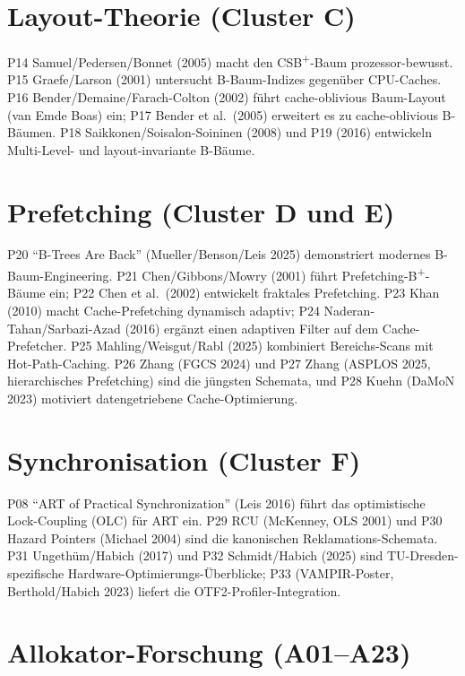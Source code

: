 \section{Layout-Theorie (Cluster C)}\label{sec:cluster-c}

P14 Samuel/Pedersen/Bonnet (2005) macht den CSB\textsuperscript{+}-Baum prozessor-bewusst.
P15 Graefe/Larson (2001) untersucht B-Baum-Indizes gegenüber CPU-Caches. P16
Bender/Demaine/Farach-Colton (2002) führt cache-oblivious Baum-Layout (van Emde Boas) ein;
P17 Bender et al.\ (2005) erweitert es zu cache-oblivious B-Bäumen. P18
Saikkonen/Soisalon-Soininen (2008) und P19 (2016) entwickeln Multi-Level- und
layout-invariante B-Bäume.

\section{Prefetching (Cluster D und E)}\label{sec:cluster-de}

P20 ``B-Trees Are Back'' (Mueller/Benson/Leis 2025) demonstriert modernes B-Baum-Engineering.
P21 Chen/Gibbons/Mowry (2001) führt Prefetching-B\textsuperscript{+}-Bäume ein; P22 Chen et
al.\ (2002) entwickelt fraktales Prefetching. P23 Khan (2010) macht Cache-Prefetching
dynamisch adaptiv; P24 Naderan-Tahan/Sarbazi-Azad (2016) ergänzt einen adaptiven Filter auf
dem Cache-Prefetcher. P25 Mahling/Weisgut/Rabl (2025) kombiniert Bereichs-Scans mit
Hot-Path-Caching. P26 Zhang (FGCS 2024) und P27 Zhang (ASPLOS 2025, hierarchisches
Prefetching) sind die jüngsten Schemata, und P28 Kuehn (DaMoN 2023) motiviert datengetriebene
Cache-Optimierung.

\section{Synchronisation (Cluster F)}\label{sec:cluster-f}

P08 ``ART of Practical Synchronization'' (Leis 2016) führt das optimistische Lock-Coupling
(OLC) für ART ein. P29 RCU (McKenney, OLS 2001) und P30 Hazard Pointers (Michael 2004) sind
die kanonischen Reklamations-Schemata. P31 Ungethüm/Habich (2017) und P32 Schmidt/Habich
(2025) sind TU-Dresden-spezifische Hardware-Optimierungs-Überblicke; P33 (VAMPIR-Poster,
Berthold/Habich 2023) liefert die OTF2-Profiler-Integration.

\section{Allokator-Forschung (A01--A23)}\label{sec:allocators}

